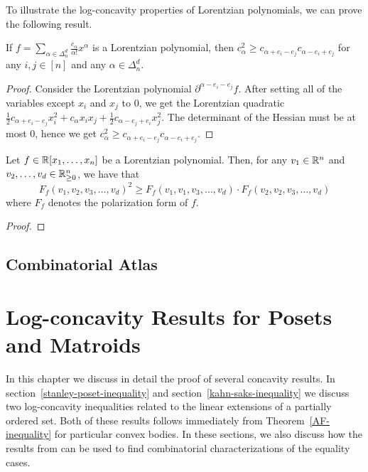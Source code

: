 \documentclass{puthesis-UG}
\begin{document}
To illustrate the log-concavity properties of Lorentzian polynomials, we can prove the following result. 

\begin{prop} \label{proposition-log-concavity-property-of-lorentzian-polynomial}
	If $f = \sum_{\alpha \in \Delta_n^d} \frac{c_\alpha}{\alpha!} x^\alpha$ is a Lorentzian polynomial, then $c_\alpha^2 \geq c_{\alpha + e_i - e_j} c_{\alpha - e_i + e_j}$ for any $i, j \in [n]$ and any $\alpha \in \Delta_n^d$. 
\end{prop}

\begin{proof}
	Consider the Lorentzian polynomial $\partial^{\alpha - e_i - e_j} f$. After setting all of the variables except $x_i$ and $x_j$ to $0$, we get the Lorentzian quadratic $\frac{1}{2} c_{\alpha + e_i - e_j} x_i^2 + c_\alpha x_i x_j + \frac{1}{2} c_{\alpha - e_j + e_i} x_j^2$. The determinant of the Hessian must be at most $0$, hence we get $c_\alpha^2 \geq c_{\alpha + e_i - e_j} c_{\alpha - e_i + e_j}$. 
\end{proof}

\begin{prop}
	Let $f \in \mathbb{R}[x_1, \ldots, x_n]$ be a Lorentzian polynomial. Then, for any $v_1 \in \mathbb{R}^n$ and $v_2, \ldots, v_d \in \mathbb{R}_{\geq 0}^n$, we have that 
	\[
		F_f(v_1, v_2, v_3, \ldots, v_d)^2 \geq F_f(v_1, v_1, v_3, \ldots, v_d) \cdot F_f(v_2, v_2, v_3, \ldots, v_d)
	\]
	where $F_f$ denotes the polarization form of $f$.  
\end{prop}

\begin{proof}
	
\end{proof}

\section{Combinatorial Atlas}


\chapter{Log-concavity Results for Posets and Matroids} \label{log-concavity-results}

In this chapter we discuss in detail the proof of several concavity results. In section~\ref{stanley-poset-inequality} and section~\ref{kahn-saks-inequality} we discuss two log-concavity inequalities related to the linear extensions of a partially ordered set. Both of these results follows immediately from Theorem~\ref{AF-inequality} for particular convex bodies. In these sections, we also discuss how the results from \cite{shenfeld2022extremals} can be used to find combinatorial characterizations of the equality cases. 
\end{document}
